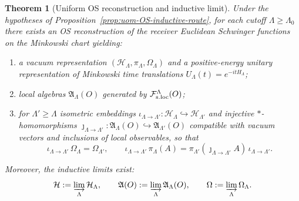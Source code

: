 \documentclass[10pt]{article}
\theoremstyle{definition}
\theoremstyle{plain}
\newtheorem{theorem}{Theorem}[section]
\begin{document}
\begin{theorem}[Uniform OS reconstruction and inductive limit]
\label{thm:uom-OS-inductive}
Under the hypotheses of Proposition~\ref{prop:uom-OS-inductive-route}, for each cutoff $\Lambda\ge \Lambda_0$ there exists an OS reconstruction
of the receiver Euclidean Schwinger functions on the Minkowski chart yielding:
\begin{enumerate}[label=\textnormal{(\roman*)},leftmargin=2.2em,itemsep=1pt]
\item a vacuum representation $(\mathcal H_\Lambda,\pi_\Lambda,\Omega_\Lambda)$ and a positive-energy
unitary representation of Minkowski time translations $U_\Lambda(t)=e^{-itH_\Lambda}$;
\item local algebras $\mathfrak A_\Lambda(O)$ generated by $\mathcal F_{\rm s.loc}^\Lambda(O)$;
\item for $\Lambda'\ge \Lambda$ isometric embeddings
\(
\iota_{\Lambda\to\Lambda'}:\mathcal H_\Lambda\hookrightarrow\mathcal H_{\Lambda'}
\)
and injective $*$-homomorphisms
\(
\jmath_{\Lambda\to\Lambda'}:\mathfrak A_\Lambda(O)\hookrightarrow\mathfrak A_{\Lambda'}(O)
\)
compatible with vacuum vectors and inclusions of local observables, so that
\[
\iota_{\Lambda\to\Lambda'}\,\Omega_\Lambda=\Omega_{\Lambda'},
\qquad
\iota_{\Lambda\to\Lambda'}\,\pi_\Lambda(A)=\pi_{\Lambda'}(\jmath_{\Lambda\to\Lambda'}A)\,\iota_{\Lambda\to\Lambda'}.
\]
\end{enumerate}
Moreover, the inductive limits exist:
\[
\mathcal H:=\varinjlim_{\Lambda}\mathcal H_\Lambda,
\qquad
\mathfrak A(O):=\varinjlim_{\Lambda}\mathfrak A_\Lambda(O),
\qquad
\Omega:=\varinjlim_{\Lambda}\Omega_\Lambda.
\]
\end{theorem}
\end{document}
